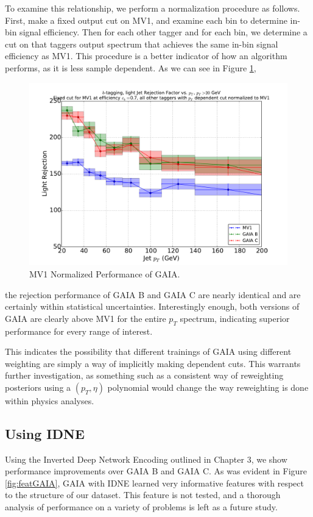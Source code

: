 To examine this relationship, we perform a normalization procedure as follows. First, make a fixed output cut on MV1, and examine each \pt bin to determine in-bin signal efficiency. Then for each other tagger and for each \pt bin, we determine a cut on that taggers output spectrum  that achieves the same in-bin signal efficiency as MV1. This procedure is a better indicator of how an algorithm performs, as it is less sample dependent. As we can see in Figure \ref{fig:urejmv1norm70}, 
\begin{figure}
\includegraphics[width=\textwidth]{figures/btag/u_rej_mv1normalized_pTdep_70pct.pdf}
\caption[The ATLAS detector]{MV1 Normalized Performance of GAIA.
\label{fig:urejmv1norm70}}
\end{figure}
the rejection performance of GAIA B and GAIA C are nearly identical and are certainly within statistical uncertainties. Interestingly enough, both versions of GAIA are clearly above MV1 for the entire $p_T$ spectrum, indicating superior performance for every \pt range of interest. 

This indicates the possibility that different trainings of GAIA using different weighting are simply a way of implicitly making \pt dependent cuts. This warrants further investigation, as something such as a consistent way of reweighting posteriors using a $(p_T, \eta)$ polynomial would change the way reweighting is done within physics analyses.

\subsection{Using IDNE}


Using the Inverted Deep Network Encoding outlined in Chapter 3, we show performance improvements over GAIA B and GAIA C. As was evident in Figure \ref{fig:featGAIA}, GAIA with IDNE learned very informative features with respect to the structure of our dataset. This feature is not tested, and a thorough analysis of performance on a variety of problems is left as a future study. 



